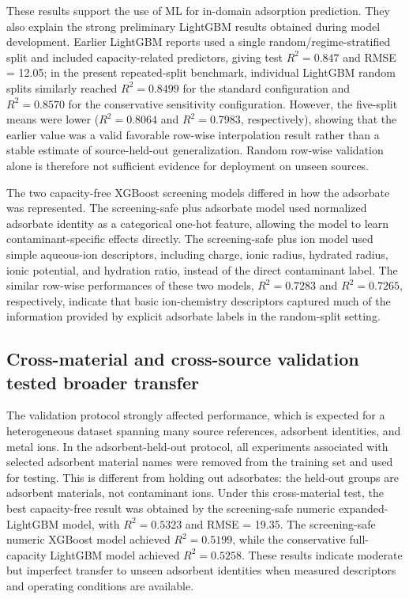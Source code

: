 \documentclass[review,12pt,number]{elsarticle}
\begin{document}
These results support the use of ML for in-domain adsorption prediction. They also explain the strong preliminary LightGBM results obtained during model development. Earlier LightGBM reports used a single random/regime-stratified split and included capacity-related predictors, giving test $R^2 = 0.847$ and RMSE = 12.05; in the present repeated-split benchmark, individual LightGBM random splits similarly reached $R^2 = 0.8499$ for the standard configuration and $R^2 = 0.8570$ for the conservative sensitivity configuration. However, the five-split means were lower ($R^2 = 0.8064$ and $R^2 = 0.7983$, respectively), showing that the earlier value was a valid favorable row-wise interpolation result rather than a stable estimate of source-held-out generalization. Random row-wise validation alone is therefore not sufficient evidence for deployment on unseen sources.

The two capacity-free XGBoost screening models differed in how the adsorbate was represented. The screening-safe plus adsorbate model used normalized adsorbate identity as a categorical one-hot feature, allowing the model to learn contaminant-specific effects directly. The screening-safe plus ion model used simple aqueous-ion descriptors, including charge, ionic radius, hydrated radius, ionic potential, and hydration ratio, instead of the direct contaminant label. The similar row-wise performances of these two models, $R^2 = 0.7283$ and $R^2 = 0.7265$, respectively, indicate that basic ion-chemistry descriptors captured much of the information provided by explicit adsorbate labels in the random-split setting.

\subsection{Cross-material and cross-source validation tested broader transfer}

The validation protocol strongly affected performance, which is expected for a heterogeneous dataset spanning many source references, adsorbent identities, and metal ions. In the adsorbent-held-out protocol, all experiments associated with selected adsorbent material names were removed from the training set and used for testing. This is different from holding out adsorbates: the held-out groups are adsorbent materials, not contaminant ions. Under this cross-material test, the best capacity-free result was obtained by the screening-safe numeric expanded-LightGBM model, with $R^2 = 0.5323$ and RMSE = 19.35. The screening-safe numeric XGBoost model achieved $R^2 = 0.5199$, while the conservative full-capacity LightGBM model achieved $R^2 = 0.5258$. These results indicate moderate but imperfect transfer to unseen adsorbent identities when measured descriptors and operating conditions are available.
\end{document}
